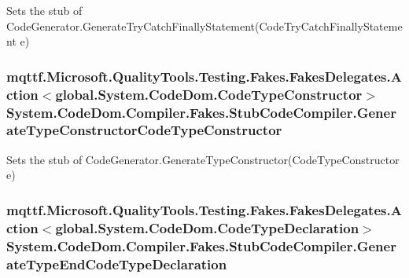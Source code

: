 Sets the stub of Code\-Generator.\-Generate\-Try\-Catch\-Finally\-Statement(\-Code\-Try\-Catch\-Finally\-Statement e)

\hypertarget{class_system_1_1_code_dom_1_1_compiler_1_1_fakes_1_1_stub_code_compiler_a69dfe03d441c571d0bd3c2c708c7c16b}{
\subsubsection[{Generate\-Type\-Constructor\-Code\-Type\-Constructor}]{\setlength{\rightskip}{0pt plus 5cm}mqttf.\-Microsoft.\-Quality\-Tools.\-Testing.\-Fakes.\-Fakes\-Delegates.\-Action$<$global.\-System.\-Code\-Dom.\-Code\-Type\-Constructor$>$ System.\-Code\-Dom.\-Compiler.\-Fakes.\-Stub\-Code\-Compiler.\-Generate\-Type\-Constructor\-Code\-Type\-Constructor}}\label{class_system_1_1_code_dom_1_1_compiler_1_1_fakes_1_1_stub_code_compiler_a69dfe03d441c571d0bd3c2c708c7c16b}


Sets the stub of Code\-Generator.\-Generate\-Type\-Constructor(\-Code\-Type\-Constructor e)

\hypertarget{class_system_1_1_code_dom_1_1_compiler_1_1_fakes_1_1_stub_code_compiler_af3162baf3b387bbe2595fb6b4b31d330}{
\subsubsection[{Generate\-Type\-End\-Code\-Type\-Declaration}]{\setlength{\rightskip}{0pt plus 5cm}mqttf.\-Microsoft.\-Quality\-Tools.\-Testing.\-Fakes.\-Fakes\-Delegates.\-Action$<$global.\-System.\-Code\-Dom.\-Code\-Type\-Declaration$>$ System.\-Code\-Dom.\-Compiler.\-Fakes.\-Stub\-Code\-Compiler.\-Generate\-Type\-End\-Code\-Type\-Declaration}}\label{class_system_1_1_code_dom_1_1_compiler_1_1_fakes_1_1_stub_code_compiler_af3162baf3b387bbe2595fb6b4b31d330}


